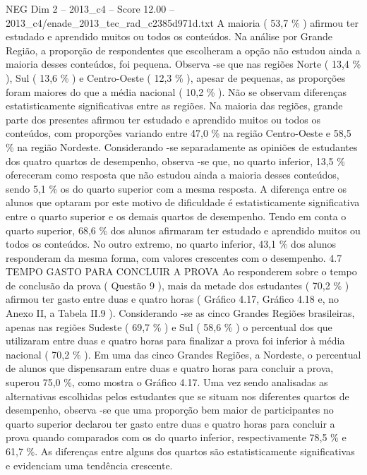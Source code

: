 \begin{textsample}{NEG Dim 2 – 2013\_c4 – Score 12.00 – 2013\_c4/enade\_2013\_tec\_rad\_c2385d971d.txt}
A maioria ( 53,7 \% ) afirmou ter estudado e aprendido muitos ou todos os conteúdos.
Na análise por Grande Região, a proporção de respondentes que escolheram a opção não estudou ainda a maioria desses conteúdos, foi pequena.
Observa -se que nas regiões Norte ( 13,4 \% ), Sul ( 13,6 \% ) e Centro-Oeste ( 12,3 \% ), apesar de pequenas, as proporções foram maiores do que a média nacional ( 10,2 \% ).
Não se observam diferenças estatisticamente significativas entre as regiões.
Na maioria das regiões, grande parte dos presentes afirmou ter estudado e aprendido muitos ou todos os conteúdos, com proporções variando entre 47,0 \% na região Centro-Oeste e 58,5 \% na região Nordeste.
Considerando -se separadamente as opiniões de estudantes dos quatro quartos de desempenho, observa -se que, no quarto inferior, 13,5 \% ofereceram como resposta que não estudou ainda a maioria desses conteúdos, sendo 5,1 \% os do quarto superior com a mesma resposta.
A diferença entre os alunos que optaram por este motivo de dificuldade é estatisticamente significativa entre o quarto superior e os demais quartos de desempenho.
Tendo em conta o quarto superior, 68,6 \% dos alunos afirmaram ter estudado e aprendido muitos ou todos os conteúdos.
No outro extremo, no quarto inferior, 43,1 \% dos alunos responderam da mesma forma, com valores crescentes com o desempenho. 4.7 TEMPO GASTO PARA CONCLUIR A PROVA Ao responderem sobre o tempo de conclusão da prova ( Questão 9 ), mais da metade dos estudantes ( 70,2 \% ) afirmou ter gasto entre duas e quatro horas ( Gráfico 4.17, Gráfico 4.18 e, no Anexo II, a Tabela II.9 ).
Considerando -se as cinco Grandes Regiões brasileiras, apenas nas regiões Sudeste ( 69,7 \% ) e Sul ( 58,6 \% ) o percentual dos que utilizaram entre duas e quatro horas para finalizar a prova foi inferior à média nacional ( 70,2 \% ).
Em uma das cinco Grandes Regiões, a Nordeste, o percentual de alunos que dispensaram entre duas e quatro horas para concluir a prova, superou 75,0 \%, como mostra o Gráfico 4.17.
Uma vez sendo analisadas as alternativas escolhidas pelos estudantes que se situam nos diferentes quartos de desempenho, observa -se que uma proporção bem maior de participantes no quarto superior declarou ter gasto entre duas e quatro horas para concluir a prova quando comparados com os do quarto inferior, respectivamente 78,5 \% e 61,7 \%.
As diferenças entre alguns dos quartos são estatisticamente significativas e evidenciam uma tendência crescente.

\end{textsample}
